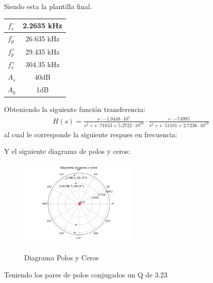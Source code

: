 Siendo esta la plantilla final.
\begin{table}[H]
\centering
\begin{tabular}{|c|c|}
\hline
$f_s^-$      & 2.2635 kHz          \\ \hline
$f_p^-$      & 26.635 kHz         \\ \hline
$f_p^+$      & 29.435 kHz           \\ \hline
$f_s^+$      & 304.35 kHz          \\ \hline
$A_s$      & 40dB           \\ \hline
$A_p$      & 1dB               \\ \hline
\end{tabular}
\end{table}
Obteniendo la siguiente función transferencia:
\begin{align}
	H(s)=\frac{s\cdot -1.0448\cdot 10^{5}}{s^2+s\cdot 71653+5.2722\cdot 10^{10}}\cdot \frac{s \cdot -74995}{s^2+s\cdot 51101+2.7236 \cdot 10^{10}}
\end{align}
al cual le corresponde la siguiente respues en frecuencia:

Y el siguiente diagrama de polos y ceros:
\begin{figure}[H]
	\centering
	\includegraphics[width=0.5\textwidth]{Imagenes-Ej2/DiagramaPolosYCeros.png}
	\label{fig:stepresponse}
	\caption{Diagrama Polos y Ceros}
\end{figure}

Teniendo los pares de polos conjugados un Q de 3.23	


